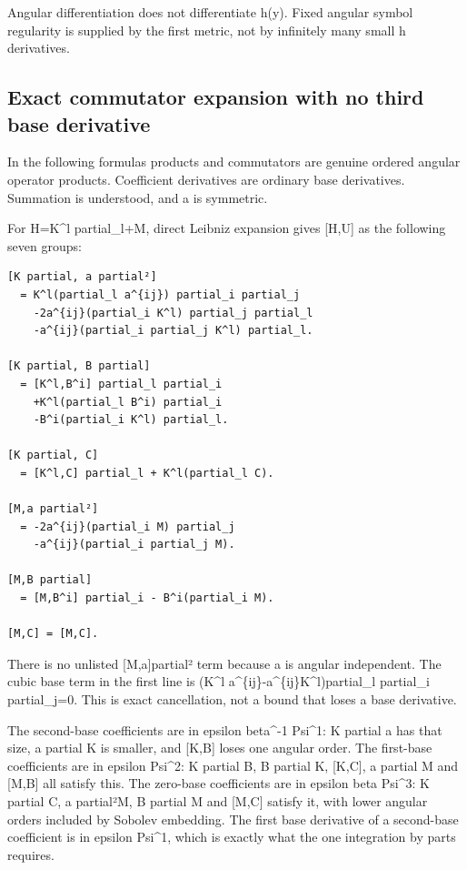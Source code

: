 \documentclass[11pt]{article}
\theoremstyle{definition}
\theoremstyle{remark}
\numberwithin{equation}{section}
\begin{document}
Angular differentiation does not differentiate h(y). Fixed angular
symbol regularity is supplied by the first metric, not by infinitely
many small h derivatives.

\hypertarget{source-71285ede3265-exact-commutator-expansion-with-no-third-base-derivative}{%
\subsection{Exact commutator expansion with no third base
derivative}\label{source-71285ede3265-exact-commutator-expansion-with-no-third-base-derivative}}

In the following formulas products and commutators are genuine ordered
angular operator products. Coefficient derivatives are ordinary base
derivatives. Summation is understood, and a is symmetric.

For H=K\^{}l partial\_l+M, direct Leibniz expansion gives {[}H,U{]} as
the following seven groups:

\begin{verbatim}
[K partial, a partial²]
  = K^l(partial_l a^{ij}) partial_i partial_j
    -2a^{ij}(partial_i K^l) partial_j partial_l
    -a^{ij}(partial_i partial_j K^l) partial_l.

[K partial, B partial]
  = [K^l,B^i] partial_l partial_i
    +K^l(partial_l B^i) partial_i
    -B^i(partial_i K^l) partial_l.

[K partial, C]
  = [K^l,C] partial_l + K^l(partial_l C).

[M,a partial²]
  = -2a^{ij}(partial_i M) partial_j
    -a^{ij}(partial_i partial_j M).

[M,B partial]
  = [M,B^i] partial_i - B^i(partial_i M).

[M,C] = [M,C].
\end{verbatim}

There is no unlisted {[}M,a{]}partial² term because a is angular
independent. The cubic base term in the first line is (K\^{}l
a\^{}\{ij\}-a\^{}\{ij\}K\^{}l)partial\_l partial\_i partial\_j=0. This
is exact cancellation, not a bound that loses a base derivative.

The second-base coefficients are in epsilon beta\^{}-1 Psi\^{}1: K
partial a has that size, a partial K is smaller, and {[}K,B{]} loses one
angular order. The first-base coefficients are in epsilon Psi\^{}2: K
partial B, B partial K, {[}K,C{]}, a partial M and {[}M,B{]} all satisfy
this. The zero-base coefficients are in epsilon beta Psi\^{}3: K partial
C, a partial²M, B partial M and {[}M,C{]} satisfy it, with lower angular
orders included by Sobolev embedding. The first base derivative of a
second-base coefficient is in epsilon Psi\^{}1, which is exactly what
the one integration by parts requires.
\end{document}
